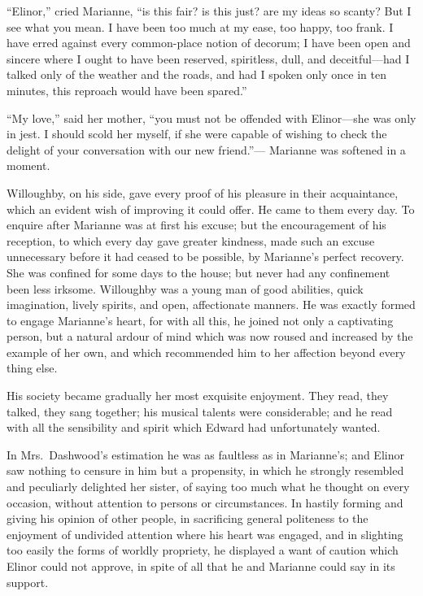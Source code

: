 ``Elinor,'' cried Marianne, ``is this fair? is this
just? are my ideas so scanty?  But I see what you mean.
I have been too much at my ease, too happy, too frank.
I have erred against every common-place notion of decorum;
I have been open and sincere where I ought to have
been reserved, spiritless, dull, and deceitful---had
I talked only of the weather and the roads, and had I
spoken only once in ten minutes, this reproach would have
been spared.''

``My love,'' said her mother, ``you must not be offended
with Elinor---she was only in jest.  I should scold
her myself, if she were capable of wishing to check
the delight of your conversation with our new friend.''---%
Marianne was softened in a moment.

Willoughby, on his side, gave every proof of his
pleasure in their acquaintance, which an evident wish
of improving it could offer.  He came to them every day.
To enquire after Marianne was at first his excuse; but the
encouragement of his reception, to which every day gave
greater kindness, made such an excuse unnecessary before it
had ceased to be possible, by Marianne's perfect recovery.
She was confined for some days to the house; but never had
any confinement been less irksome.  Willoughby was a young
man of good abilities, quick imagination, lively spirits,
and open, affectionate manners.  He was exactly formed
to engage Marianne's heart, for with all this, he joined
not only a captivating person, but a natural ardour
of mind which was now roused and increased by the example
of her own, and which recommended him to her affection
beyond every thing else.

His society became gradually her most exquisite enjoyment.
They read, they talked, they sang together; his musical
talents were considerable; and he read with all the
sensibility and spirit which Edward had unfortunately wanted.

In Mrs.\ Dashwood's estimation he was as faultless
as in Marianne's; and Elinor saw nothing to censure in him
but a propensity, in which he strongly resembled and peculiarly
delighted her sister, of saying too much what he thought on
every occasion, without attention to persons or circumstances.
In hastily forming and giving his opinion of other people,
in sacrificing general politeness to the enjoyment
of undivided attention where his heart was engaged,
and in slighting too easily the forms of worldly propriety,
he displayed a want of caution which Elinor could not approve,
in spite of all that he and Marianne could say in its support.

